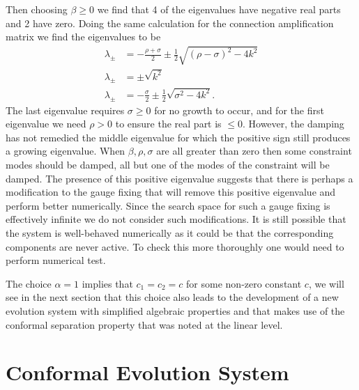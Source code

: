 \documentclass[10pt]{report}
\theoremstyle{definition}
\begin{document}
    Then choosing $\beta \geq 0$ we find that 4 of the eigenvalues have negative real parts and 2 have zero. Doing the same calculation for the connection amplification matrix we find the eigenvalues to be 
    \begin{align}
        \lambda_\pm & = -\frac{\rho+\sigma}{2} \pm \frac{1}{2} \sqrt{(\rho-\sigma)^2 -4k^2} \\
        \lambda_\pm & = \pm \sqrt{k^2} \\
        \lambda_\pm & = -\frac{\sigma}{2} \pm \frac{1}{2} \sqrt{\sigma^2 - 4k^2}.
    \end{align}
    The last eigenvalue requires $\sigma \geq 0$ for no growth to occur, and for the first eigenvalue we need $\rho > 0$ to ensure the real part is $\leq 0$. However, the damping has not remedied the middle eigenvalue for which the positive sign still produces a growing eigenvalue. When $\beta,\rho,\sigma$ are all greater than zero then some constraint modes should be damped, all but one of the modes of the constraint will be damped. The presence of this positive eigenvalue suggests that there is perhaps a modification to the gauge fixing that will remove this positive eigenvalue and perform better numerically. Since the search space for such a gauge fixing is effectively infinite we do not consider such modifications. It is still possible that the system is well-behaved numerically as it could be that the corresponding components are never active. To check this more thoroughly one would need to perform numerical test.

    The choice $\alpha=1$ implies that $c_1 = c_2 = c$ for some non-zero constant $c$, we will see in the next section that this choice also leads to the development of a new evolution system with simplified algebraic properties and that makes use of the conformal separation property that was noted at the linear level.

    \section{Conformal Evolution System} \label{sec:pleb-num-conformal-evolution-systems}
\end{document}

